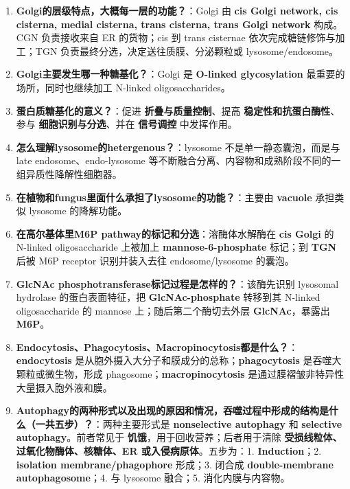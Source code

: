 \documentclass[12pt,fontset=none]{ctexart}
\begin{document}
\begin{enumerate}
\item \textbf{Golgi的层级特点，大概每一层的功能？}：Golgi 由 \textbf{cis Golgi network, cis cisterna, medial cisterna, trans cisterna, trans Golgi network} 构成。CGN 负责接收来自 ER 的货物；cis 到 trans cisternae 依次完成糖链修饰与加工；TGN 负责最终分选，决定送往质膜、分泌颗粒或 lysosome/endosome。

\item \textbf{Golgi主要发生哪一种糖基化？}：Golgi 是 \textbf{O-linked glycosylation} 最重要的场所，同时也继续加工 N-linked oligosaccharides。

\item \textbf{蛋白质糖基化的意义？}：促进 \textbf{折叠与质量控制}、提高 \textbf{稳定性和抗蛋白酶性}、参与 \textbf{细胞识别与分选}、并在 \textbf{信号调控} 中发挥作用。

\item \textbf{怎么理解lysosome的hetergenous？}：lysosome 不是单一静态囊泡，而是与 late endosome、endo-lysosome 等不断融合分离、内容物和成熟阶段不同的一组异质性降解性细胞器。

\item \textbf{在植物和fungus里面什么承担了lysosome的功能？}：主要由 \textbf{vacuole} 承担类似 lysosome 的降解功能。

\item \textbf{在高尔基体里M6P pathway的标记和分选}：溶酶体水解酶在 \textbf{cis Golgi} 的 N-linked oligosaccharide 上被加上 \textbf{mannose-6-phosphate} 标记；到 \textbf{TGN} 后被 M6P receptor 识别并装入去往 endosome/lysosome 的囊泡。

\item \textbf{GlcNAc phosphotransferase标记过程是怎样的？}：该酶先识别 lysosomal hydrolase 的蛋白表面特征，把 \textbf{GlcNAc-phosphate} 转移到其 N-linked oligosaccharide 的 mannose 上；随后第二个酶切去外层 \textbf{GlcNAc}，暴露出 \textbf{M6P}。

\item \textbf{Endocytosis、Phagocytosis、Macropinocytosis都是什么？}：\textbf{endocytosis} 是从胞外摄入大分子和膜成分的总称；\textbf{phagocytosis} 是吞噬大颗粒或微生物，形成 phagosome；\textbf{macropinocytosis} 是通过膜褶皱非特异性大量摄入胞外液和膜。

\item \textbf{Autophagy的两种形式以及出现的原因和情况，吞噬过程中形成的结构是什么（一共五步）？}：两种主要形式是 \textbf{nonselective autophagy} 和 \textbf{selective autophagy}。前者常见于 \textbf{饥饿}，用于回收营养；后者用于清除 \textbf{受损线粒体、过氧化物酶体、核糖体、ER 或入侵病原体}。五步为：1. \textbf{Induction}；2. \textbf{isolation membrane/phagophore} 形成；3. 闭合成 \textbf{double-membrane autophagosome}；4. 与 lysosome 融合；5. 消化内膜与内容物。
\end{enumerate}
\end{document}
